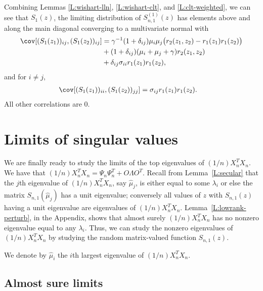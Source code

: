 Combining Lemmas \ref{L:wishart-lln}, \ref{L:wishart-clt}, and 
\ref{L:clt-weighted}, we can see that $S_1(z)$, the limiting distribution of
$S_{n,1}^{(1)}(z)$ has elements above and along the main diagonal converging
to a multivariate normal with
\begin{align}
    \cov[ (S_1(z_1))_{ij}, (S_1(z_2))_{ij} ]
    &= \gamma^{-1} (1 + \delta_{ij}) \mu_i \mu_j 
                 \big( r_2 (z_1, z_2) - r_1(z_1) r_1 (z_2) \big) \notag \\
      &+ (1 + \delta_{ij}) (\mu_i + \mu_j + \gamma) r_2(z_1, z_2) \notag \\
      &+ \delta_{ij} \sigma_{ii} r_1(z_1) r_1(z_2), \label{E:cov-S1-1}
\end{align}
and for $i \neq j$,
\begin{align}
    \cov[ (S_1(z_1))_{ii}, (S_1(z_2))_{jj} ]
    &= \sigma_{ij} r_1(z_1) r_1(z_2). \label{E:cov-S1-2}
\end{align}
All other correlations are $0$.

\section{Limits of singular values}

We are finally ready to study the limits of the top eigenvalues of
$(1/n) X_n^T X_n$.  We have that
$(1/n) X_n^T X_n = \Psi_n \Psi_n^T + O \Lambda O^T$. Recall from
Lemma~\ref{L:secular} that the $j$th eigenvalue of $(1/n) X_n^T X_n$, say 
$\hat \mu_j$, is either equal to some $\lambda_i$ or else the matrix
$S_{n,1}(\hat \mu_j)$ has a unit eigenvalue; conversely all values of $z$ with
$S_{n,1}(z)$ having a unit eigenvalue are eigenvalues of $(1/n) X_n^T X_n$.
Lemma~\ref{L:lowrank-perturb}, in the Appendix, shows that  almost surely
$(1/n) X_n^T X_n$ has no nonzero eigenvalue equal to any $\lambda_i$.  Thus,
we can study the nonzero eigenvalues of $(1/n) X_n^T X_n$ by studying the
random matrix-valued function $S_{n,1}(z)$.

We denote by $\hat \mu_i$ the $i$th largest eigenvalue of $(1/n) X_n^T X_n$.

\subsection{Almost sure limits}\label{SS:value-limit}

